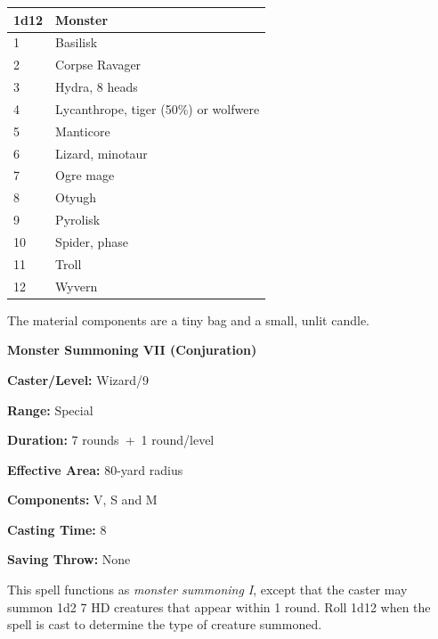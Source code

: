 \begin{multicols}{2}
\noindent
\begin{tabular}{|p{}|p{}|}
\hline
1d12	& Monster \\
\hline\hline
\rowcolor[gray]{.9}1	& Basilisk \\
2	& Corpse Ravager \\
\rowcolor[gray]{.9}3	& Hydra, 8 heads \\
4	& Lycanthrope, tiger (50\%) or wolfwere \\
\rowcolor[gray]{.9}5	& Manticore \\
6	& Lizard, minotaur \\
\rowcolor[gray]{.9}7	& Ogre mage \\
8	& Otyugh \\
\rowcolor[gray]{.9}9	& Pyrolisk \\
10	& Spider, phase \\
\rowcolor[gray]{.9}11	& Troll \\
12	& Wyvern \\
\hline
\end{tabular}

The material components are a tiny bag and a small, unlit candle.
 
\vspace{1em}

\noindent
\begin{minipage}{\columnwidth}

\noindent \textbf{Monster Summoning VII (Conjuration)}

\noindent \textbf{Caster/Level:} Wizard/9

\noindent \textbf{Range:} Special

\noindent \textbf{Duration:} 7 rounds~+~1 round/level

\noindent \textbf{Effective Area:} 80-yard radius

\noindent \textbf{Components:} V, S and M

\noindent \textbf{Casting Time:} 8

\noindent \textbf{Saving Throw:} None

\end{minipage}

This spell functions as \textit{monster summoning I}, except that the caster may summon 1d2 7 HD creatures that appear within 1 round.  Roll 1d12 when the spell is cast to determine the type of creature summoned.


\end{multicols}
